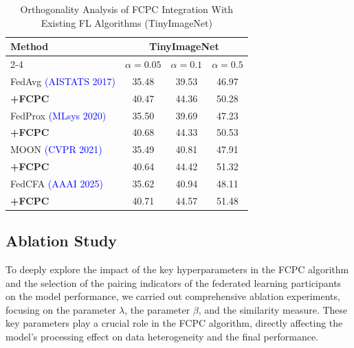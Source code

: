 \documentclass[journal,twoside,web]{ieeecolor}
\begin{document}
\begin{table}[!t]
\centering
\footnotesize %
\caption{Orthogonality Analysis of FCPC Integration With Existing FL Algorithms (TinyImageNet)}
\label{tab:tinyimagenet}

\begin{tabular}{lccc}
\toprule
Method & \multicolumn{3}{c}{TinyImageNet} \\ %
\cmidrule(lr){2-4}  %
       & \textbf{$\alpha = 0.05$} & \textbf{$\alpha = 0.1$} & \textbf{$\alpha = 0.5$} \\
\midrule
FedAvg {\textcolor{blue}{\scriptsize (AISTATS 2017)}} & 35.48 & 39.53 & 46.97 \\ %
\textbf{  +FCPC} & 40.47 & 44.36 & 50.28 \\
\midrule
FedProx {\textcolor{blue}{\scriptsize (MLsys 2020)}} & 35.50 & 39.69 & 47.23 \\ %
\textbf{  +FCPC} & 40.68 & 44.33 & 50.53 \\
\midrule
MOON {\textcolor{blue}{\scriptsize (CVPR 2021)}} & 35.49 & 40.81 & 47.91 \\ %
\textbf{  +FCPC} & 40.64 & 44.42 & 51.32 \\
\midrule
FedCFA {\textcolor{blue}{\scriptsize (AAAI 2025)}} & 35.62 & 40.94 & 48.11 \\ %
\textbf{  +FCPC} & 40.71 & 44.57 & 51.48 \\
\bottomrule
\end{tabular}

\end{table}







\subsection{Ablation Study}

To deeply explore the impact of the key hyperparameters in the FCPC algorithm and the selection of the pairing indicators of the federated learning participants on the model performance, we carried out comprehensive ablation experiments, focusing on the parameter \(\lambda\), the parameter \(\beta\), and the similarity measure. These key parameters play a crucial role in the FCPC algorithm, directly affecting the model's processing effect on data heterogeneity and the final performance.
\end{document}
